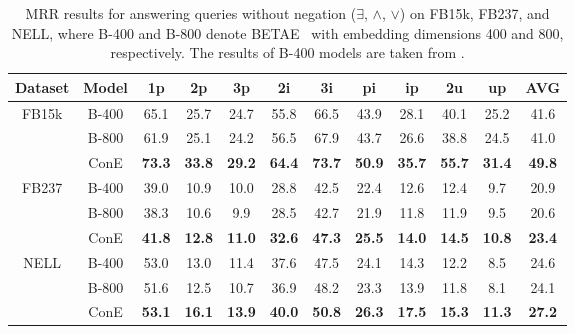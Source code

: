 \documentclass{article}
\newcommand{\betae}{{\normalsize{B}\footnotesize{ETA}\normalsize{E}}}
\begin{document}
\vspace{5mm}
\begin{table}[ht]
    \centering
    \caption{MRR results for answering queries without negation ($\exists$, $\land$, $\lor$) on FB15k, FB237, and NELL, where B-400 and B-800 denote \betae~ with embedding dimensions 400 and 800, respectively.
    The results of B-400 models are taken from \citet{beta}.}
    \label{table:epfo_results_800}
    \vspace{1mm}
    \begin{tabular}{c c c c c c c c c c c c }
        \toprule
         \textbf{Dataset} & \textbf{Model} &\textbf{1p} &\textbf{2p} &\textbf{3p} &\textbf{2i} &\textbf{3i} &\textbf{pi} &\textbf{ip} &\textbf{2u} &\textbf{up} &\textbf{AVG}\\
        \midrule
        \multirow{3}{*}{FB15k}
        &B-400 &65.1 &25.7 &24.7 &55.8 &66.5 &43.9 &28.1 &40.1 &25.2&41.6\\
        &B-800 &61.9 &25.1 &24.2 &56.5 &67.9 &43.7 &26.6 &38.8 &24.5  &41.0\\
        &ConE &\textbf{73.3} & \textbf{33.8} &\textbf{29.2} &\textbf{64.4} &\textbf{73.7} &\textbf{50.9} &\textbf{35.7} &\textbf{55.7} &\textbf{31.4}  &\textbf{49.8}\\
        \midrule
        \multirow{3}{*}{FB237}
        &B-400 &39.0 &10.9 &10.0 &28.8 &42.5 &22.4 &12.6 &12.4 &9.7 &20.9\\
        &B-800 &38.3 &10.6 &9.9 &28.5 &42.7 &21.9 &11.8 &11.9 &9.5  &20.6\\
        &ConE &\textbf{41.8} &\textbf{12.8} &\textbf{11.0} &\textbf{32.6} &\textbf{47.3} &\textbf{25.5} &\textbf{14.0} &\textbf{14.5} &\textbf{10.8}  &\textbf{23.4}\\
        \midrule
        \multirow{3}{*}{NELL}
        &B-400 &53.0 &13.0 &11.4 &37.6 &47.5 &24.1 &14.3 &12.2 &8.5 &24.6\\
        &B-800 &51.6 &12.5 &10.7 &36.9 &48.2 &23.3 &13.9 &11.8 &8.1  &24.1\\
        &ConE &\textbf{53.1} &\textbf{16.1} &\textbf{13.9} &\textbf{40.0} &\textbf{50.8} &\textbf{26.3} &\textbf{17.5} &\textbf{15.3} &\textbf{11.3} &\textbf{27.2}\\
        \bottomrule
    \end{tabular}
    \vspace{-1mm}
\end{table}
\end{document}
